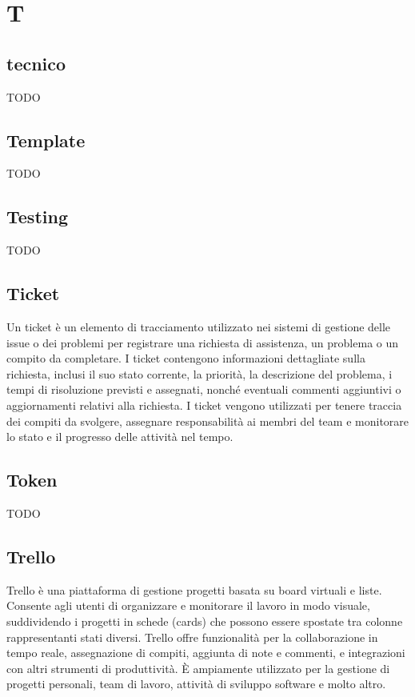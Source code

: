 \section{T}

\vspace{2em}
\subsection*{tecnico}
TODO

\vspace{2em}
\subsection*{Template}
TODO

\vspace{2em}
\subsection*{Testing}
TODO

\vspace{2em}
\subsection*{Ticket}
Un ticket è un elemento di tracciamento utilizzato nei sistemi di gestione delle issue o dei problemi per registrare una richiesta di assistenza, un problema o un compito da completare. I ticket contengono informazioni dettagliate sulla richiesta, inclusi il suo stato corrente, la priorità, la descrizione del problema, i tempi di risoluzione previsti e assegnati, nonché eventuali commenti aggiuntivi o aggiornamenti relativi alla richiesta. I ticket vengono utilizzati per tenere traccia dei compiti da svolgere, assegnare responsabilità ai membri del team e monitorare lo stato e il progresso delle attività nel tempo.

\vspace{2em}
\subsection*{Token}
TODO

\vspace{2em}
\subsection*{Trello}
Trello è una piattaforma di gestione progetti basata su board virtuali e liste. Consente agli utenti di organizzare e monitorare il lavoro in modo visuale, suddividendo i progetti in schede (cards) che possono essere spostate tra colonne rappresentanti stati diversi. Trello offre funzionalità per la collaborazione in tempo reale, assegnazione di compiti, aggiunta di note e commenti, e integrazioni con altri strumenti di produttività. È ampiamente utilizzato per la gestione di progetti personali, team di lavoro, attività di sviluppo software e molto altro.

